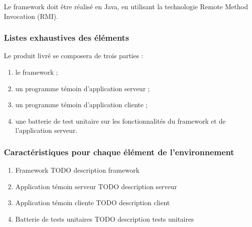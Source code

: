 Le framework doit être réalisé en Java, en utilisant la technologie Remote Method Invocation (RMI).

\subsubsection{Listes exhaustives des éléments} 
Le produit livré se composera de trois parties :
\begin{enumerate}
 \item le framework ;
 \item un programme témoin d'application serveur ;
 \item un programme témoin d'application cliente ;
 \item une batterie de test unitaire sur les fonctionnalités du framework et de l'application serveur.
\end{enumerate}

\subsubsection{Caractéristiques pour chaque élément de l’environnement}
\begin{enumerate}
 \item Framework
TODO description framework
 \item Application témoin serveur
 TODO description serveur
 \item Application témoin cliente
TODO description client
 \item Batterie de tests unitaires
TODO description tests unitaires
\end{enumerate}
